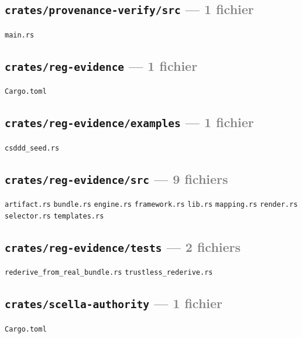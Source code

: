 \documentclass[10pt]{report}
\newcommand{\code}[1]{\texttt{\small #1}}
\begin{document}
\subsection*{\code{crates/provenance-verify/src} \normalfont\textcolor{grey}{--- 1 fichier}}
\begin{sloppypar}\footnotesize\raggedright
\code{main.rs}
\end{sloppypar}

\subsection*{\code{crates/reg-evidence} \normalfont\textcolor{grey}{--- 1 fichier}}
\begin{sloppypar}\footnotesize\raggedright
\code{Cargo.toml}
\end{sloppypar}

\subsection*{\code{crates/reg-evidence/examples} \normalfont\textcolor{grey}{--- 1 fichier}}
\begin{sloppypar}\footnotesize\raggedright
\code{csddd\_seed.rs}
\end{sloppypar}

\subsection*{\code{crates/reg-evidence/src} \normalfont\textcolor{grey}{--- 9 fichiers}}
\begin{sloppypar}\footnotesize\raggedright
\code{artifact.rs} \;\textbullet\; \code{bundle.rs} \;\textbullet\; \code{engine.rs} \;\textbullet\; \code{framework.rs} \;\textbullet\; \code{lib.rs} \;\textbullet\; \code{mapping.rs} \;\textbullet\; \code{render.rs} \;\textbullet\; \code{selector.rs} \;\textbullet\; \code{templates.rs}
\end{sloppypar}

\subsection*{\code{crates/reg-evidence/tests} \normalfont\textcolor{grey}{--- 2 fichiers}}
\begin{sloppypar}\footnotesize\raggedright
\code{rederive\_from\_real\_bundle.rs} \;\textbullet\; \code{trustless\_rederive.rs}
\end{sloppypar}

\subsection*{\code{crates/scella-authority} \normalfont\textcolor{grey}{--- 1 fichier}}
\begin{sloppypar}\footnotesize\raggedright
\code{Cargo.toml}
\end{sloppypar}
\end{document}
